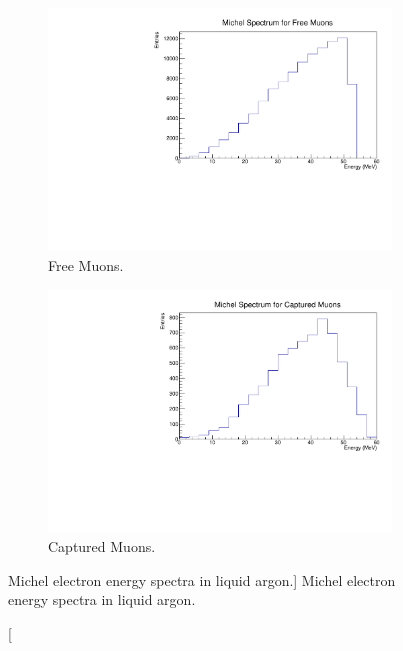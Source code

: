 \begin{figure}

	\centering
	\centering
	\begin{subfigure}[b]{0.7\textwidth}
		\centering
		\includegraphics[width=\textwidth]{figures/michel_spec_free.pdf}
		\caption {Free Muons.}
		\label{fig:michel_spec_free}
	\end{subfigure}
	\begin{subfigure}[b]{0.7\textwidth}
		\centering
		\includegraphics[width=\textwidth]{figures/michel_spec_cap.pdf}
		\caption {Captured Muons.}
		\label{fig:michel_spec_cap}
	\end{subfigure}

	\caption
	[Michel electron energy spectra in liquid argon.]
	{Michel electron energy spectra in liquid argon.}

	\label{fig:michel_spec}

\end{figure}

